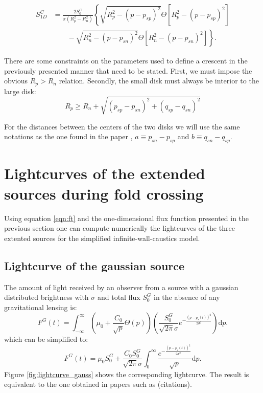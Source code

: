 \begin{align}
 S_{1D}^C &= \frac{2 S_0^C}{\pi \left(R_p^2-R_n^2 \right)} \left\{ \sqrt{R_p^2 - (p-p_{sp})^2}  \Theta \left[ R_p^2 - \left( p-p_{sp} \right)^2 \right] \right.\nonumber\\
 &\qquad \left. {} - \sqrt{R_n^2 - (p-p_{sn})^2 } \Theta \left[ R_n^2 - \left( p-p_{sn} \right)^2 \right] \right\}.
\end{align}


There are some constraints on the parameters used to define a crescent in the previously presented manner that need to be stated. First, we must impose the obvious $R_p > R_n$ relation. Secondly, 
the small disk must always be interior to the large disk:
\begin{equation}
 R_p \ge R_n + \sqrt{\left(p_{sp} - p_{sn} \right)^2 + \left(q_{sp} - q_{sn} \right)^2}
\end{equation}

For the distances between the centers of the two disks we will use the same notations as the one found in the paper \citep{2013MNRAS.434..765K}, $a \equiv p_{sn} - p_{sp}$ and $b \equiv q_{sn} - q_{sp}$.

\section{Lightcurves of the extended sources during fold crossing}

Using equation \ref{eqn:ft} and the one-dimensional flux function presented in the previous section one can compute numerically the lightcurves of the three extented sources for the simplified 
infinite-wall-caustics model.

\subsection{Lightcurve of the gaussian source}

The amount of light received by an observer from a source with a gaussian distributed brightness with $\sigma$ and total flux $S_0^G$ in the absence of any gravitational lensing is:
\begin{equation}
 F^G(t) = \int_{-\infty}^\infty  \left( \mu_0 + \frac{C_0}{\sqrt{p}} \Theta \left( p \right) \right) \left( \frac{S_0^G}{\sqrt{2 \pi} \sigma} e^{-\frac{(p-p_s(t))^2}{2 \sigma^2}} \right) \mathrm{d}p.
\end{equation}
which can be simplified to:
\begin{equation}
 F^G(t) = \mu_0 S_0^G + \frac{C_0 S_0^G}{\sqrt{2\pi} \sigma} \int_{0}^\infty \frac{e^{-\frac{(p-p_s(t))^2}{2 \sigma^2}}}{\sqrt{p}} \mathrm{d}p.
\end{equation}
Figure \ref{fig:lightcurve_gauss} shows the corresponding lightcurve. The result is equivalent to the one obtained in papers such as (citations).\\

